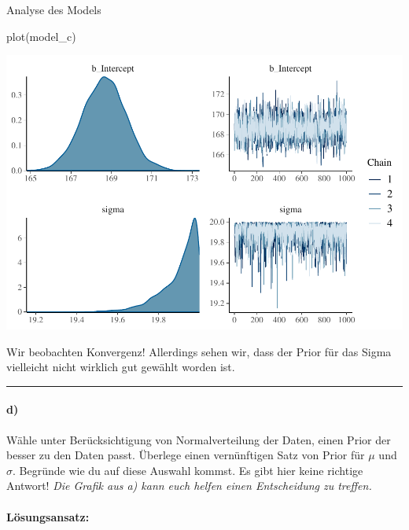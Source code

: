 \documentclass[
]{article}
\newenvironment{Shaded}{\begin{snugshade}}{\end{snugshade}}
\newcommand{\FunctionTok}[1]{\textcolor[rgb]{0.00,0.00,0.00}{#1}}
\newcommand{\NormalTok}[1]{#1}
\begin{document}
Analyse des Models

\begin{Shaded}
\begin{Highlighting}[]
\FunctionTok{plot}\NormalTok{(model\_c)}
\end{Highlighting}
\end{Shaded}

\includegraphics{Loesung-Zettel-2_files/figure-latex/unnamed-chunk-4-1.pdf}

Wir beobachten Konvergenz! Allerdings sehen wir, dass der Prior für das
Sigma vielleicht nicht wirklich gut gewählt worden ist.

\begin{center}\rule{0.5\linewidth}{0.5pt}\end{center}

\hypertarget{d}{%
\paragraph{d)}\label{d}}

Wähle unter Berücksichtigung von Normalverteilung der Daten, einen Prior
der besser zu den Daten passt. Überlege einen vernünftigen Satz von
Prior für \(\mu\) und \(\sigma\). Begründe wie du auf diese Auswahl
kommst. Es gibt hier keine richtige Antwort!
\textit{Die Grafik aus a) kann euch helfen einen Entscheidung zu treffen.}

\hypertarget{luxf6sungsansatz-3}{%
\paragraph{Lösungsansatz:}\label{luxf6sungsansatz-3}}
\end{document}
